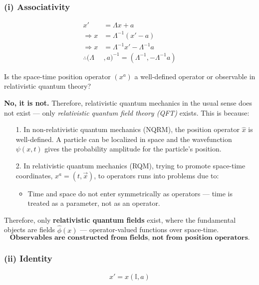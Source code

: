 \documentclass[14pt]{article} %
\begin{document}
\subsubsection*{(i) Associativity}
\vspace{-0.7cm}
\begin{align*}
    x' &= \Lambda x + a \\
    \Rightarrow x &= \Lambda^{-1} (x' - a) \\
    \Rightarrow x &= \Lambda^{-1} x' -  \Lambda^{-1}a \\
    \therefore (\Lambda&, a)^{-1} = (\Lambda^{-1}, -\Lambda^{-1}a) \tag{4.1} \label{eq:4.1}
\end{align*}
\begin{tcolorbox}[ title=\textbf{Note:}]

Is the space-time position operator $(x^a)$ a well-defined operator or observable in relativistic quantum theory? 

\medskip

\noindent \textbf{No, it is not.} Therefore, relativistic quantum mechanics in the usual sense does not exist — only \textit{relativistic quantum field theory (QFT)} exists. This is because:

\begin{itemize}
    \item [1.] In non-relativistic quantum mechanics (NQRM), the position operator $\hat{x}$ is well-defined. A particle can be localized in space and the wavefunction $\psi(x,t)$ gives the probability amplitude for the particle's position.
    
    \item [2.] In relativistic quantum mechanics (RQM), trying to promote space-time coordinates, $x^a = (t, \vec{x})$, to operators runs into problems due to:    
    \begin{itemize}
        \item Time and space do not enter symmetrically as operators — time is treated as a parameter, not as an operator.
    \end{itemize}
\end{itemize}

\noindent Therefore, only \textbf{relativistic quantum fields} exist, where the fundamental objects are fields $\hat{\phi}(x)$ — operator-valued functions over space-time.
$$\textbf{Observables are constructed from fields, not from position operators.}$$
\end{tcolorbox}

\subsubsection*{(ii) Identity}
\vspace{-0.7cm}
\begin{align*}
x' = x(\mathbb{I},a)
\end{align*}
\end{document}
